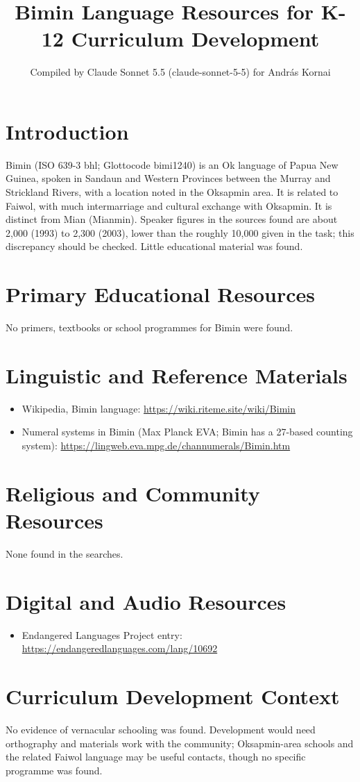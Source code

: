 \documentclass[12pt]{article}
\title{Bimin Language Resources for K-12 Curriculum Development}
\author{Compiled by Claude Sonnet 5.5 (claude-sonnet-5-5) for Andr\'as Kornai}
\date{}
\begin{document}
\maketitle

\section{Introduction}
Bimin (ISO 639-3 bhl; Glottocode bimi1240) is an Ok language of Papua New Guinea, spoken in Sandaun and Western Provinces between the Murray and Strickland Rivers, with a location noted in the Oksapmin area. It is related to Faiwol, with much intermarriage and cultural exchange with Oksapmin. It is distinct from Mian (Mianmin). Speaker figures in the sources found are about 2,000 (1993) to 2,300 (2003), lower than the roughly 10,000 given in the task; this discrepancy should be checked. Little educational material was found.

\section{Primary Educational Resources}
No primers, textbooks or school programmes for Bimin were found.

\section{Linguistic and Reference Materials}
\begin{itemize}
\item Wikipedia, Bimin language: \url{https://wiki.riteme.site/wiki/Bimin}
\item Numeral systems in Bimin (Max Planck EVA; Bimin has a 27-based counting system): \url{https://lingweb.eva.mpg.de/channumerals/Bimin.htm}
\end{itemize}

\section{Religious and Community Resources}
None found in the searches.

\section{Digital and Audio Resources}
\begin{itemize}
\item Endangered Languages Project entry: \url{https://endangeredlanguages.com/lang/10692}
\end{itemize}

\section{Curriculum Development Context}
No evidence of vernacular schooling was found. Development would need orthography and materials work with the community; Oksapmin-area schools and the related Faiwol language may be useful contacts, though no specific programme was found.
\end{document}
